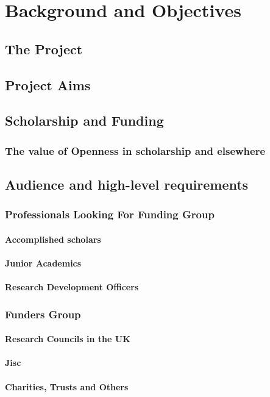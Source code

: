 \chapter{Background and Objectives}
\section{The Project}
\section{Project Aims}
\section{Scholarship and Funding}
\subsection{The value of Openness in scholarship and elsewhere}
\section{Audience and high-level requirements}
\subsection{Professionals Looking For Funding Group}
\subsubsection{Accomplished scholars}
\subsubsection{Junior Academics}
\subsubsection{Research Development Officers}
\subsection{Funders Group}
\subsubsection{Research Councils in the UK}
\subsubsection{Jisc}
\subsubsection{Charities, Trusts and Others}
